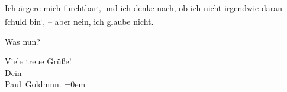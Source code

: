 \pstart
           Ich ärgere mich furchtbar\substVorne{}\textsuperscript{.}\substDazwischen{},\substHinten{} und ich denke nach, ob ich nicht irgendwie daran{ }ſchuld bin\substVorne{}\textsuperscript{.}\substDazwischen{},\substHinten{} – aber nein, ich glaube nicht.\pend
           
\pstart
           {\pb}Was nun?\pend
           
\pstart
           Viele treue Grüße! {\\[\baselineskip]}Dein{\\[\baselineskip]}\spacefill\mbox{Paul Goldmnn.}\pend
           \leftskip=0em{}\endnumbering{}  \newcommand{\dateiname}{L02760}\newcommand{\titel}{Paul Goldmann an Arthur Schnitzler, 21. 12. [1895]}\newcommand{\editorInnen}{Martin Anton Müller und Laura Untner}
